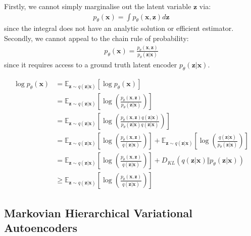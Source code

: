 \documentclass[ oneside,%
                    author={George Herbert},
                    degree={MSci},
                     title={Video Diffusion Models for Climate Simulations},
                  subtitle={}]{dissertation}
\begin{document}
Firstly, we cannot simply marginalise out the latent variable $\mathbf{z}$ via:
\begin{align}
      p_\theta(\mathbf{x})=\int p_\theta(\mathbf{x},\mathbf{z})d\mathbf{z}
\end{align}
since the integral does not have an analytic solution or efficient estimator. Secondly, we cannot appeal to the chain rule of probability:
\begin{align}
      p_\theta(\mathbf{x})=\frac{p_\theta(\mathbf{x},\mathbf{z})}{p_\theta(\mathbf{z}|\mathbf{x})}
\end{align}
since it requires access to a ground truth latent encoder $p_\theta(\mathbf{z}|\mathbf{x})$.



\begin{align}
      \log p_\theta(\mathbf{x})&=\mathbb{E}_{\mathbf{z}\sim q(\mathbf{z}|\mathbf{x})}\left[\log p_\theta(\mathbf{x})\right]\\
      &=\mathbb{E}_{\mathbf{z}\sim q(\mathbf{z}|\mathbf{x})}\left[\log\left(\frac{p_\theta(\mathbf{x},\mathbf{z})}{p_\theta(\mathbf{z}|\mathbf{x})}\right)\right]\\
      &=\mathbb{E}_{\mathbf{z}\sim q(\mathbf{z}|\mathbf{x})}\left[\log\left(\frac{p_\theta(\mathbf{x},\mathbf{z})q(\mathbf{z}|\mathbf{x})}{p_\theta(\mathbf{z}|\mathbf{x})q(\mathbf{z}|\mathbf{x})}\right)\right]\\
      &=\mathbb{E}_{\mathbf{z}\sim q(\mathbf{z}|\mathbf{x})}\left[\log\left(\frac{p_\theta(\mathbf{x},\mathbf{z})}{q(\mathbf{z}|\mathbf{x})}\right)\right]+\mathbb{E}_{\mathbf{z}\sim q(\mathbf{z}|\mathbf{x})}\left[\log\left(\frac{q(\mathbf{z}|\mathbf{x})}{p_\theta(\mathbf{z}|\mathbf{x})}\right)\right]\\
      &=\mathbb{E}_{\mathbf{z}\sim q(\mathbf{z}|\mathbf{x})}\left[\log\left(\frac{p_\theta(\mathbf{x},\mathbf{z})}{q(\mathbf{z}|\mathbf{x})}\right)\right]+D_{KL}(q(\mathbf{z}|\mathbf{x})\Vert p_\theta(\mathbf{z}|\mathbf{x}))\\
      &\ge \mathbb{E}_{\mathbf{z}\sim q(\mathbf{z}|\mathbf{x})}\left[\log\left(\frac{p_\theta(\mathbf{x},\mathbf{z})}{q(\mathbf{z}|\mathbf{x})}\right)\right]
\end{align}


\subsection{Markovian Hierarchical Variational Autoencoders}
\label{sec:background_vae_hierarchical}
\end{document}
